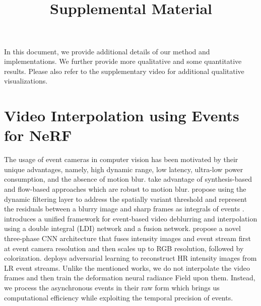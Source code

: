 \documentclass[10pt,twocolumn,letterpaper]{article}
\begin{document}
\title{\paperTitle \\ Supplemental Material}
\author{\authorBlock}
\maketitle
\renewcommand\thesection{\Alph{section}}
In this document, we provide additional details of our method and implementations. We further provide more qualitative and some quantitative results. Please also refer to the supplementary video for additional qualitative visualizations. 


\section{Video Interpolation using Events for NeRF}
The usage of event cameras in computer vision has been motivated by their unique advantages, namely, high dynamic range, low latency, ultra-low power consumption, and the absence of motion blur. \cite{tulyakov2021time} take advantage of synthesis-based and flow-based approaches which are robust to motion blur. \cite{lin2020learning} propose using the dynamic filtering layer to address the spatially variant threshold and represent the residuals between a blurry image and sharp frames as integrals of events \cite{pan2019bringing}. \cite{zhang2022unifying} introduces a unified framework for event-based video deblurring and interpolation using a double integral (LDI) network and a fusion network. \cite{paikin2021efi} propose a novel three-phase CNN architecture that fuses intensity images and event stream first at event camera resolution and then scales up to RGB resolution, followed by colorization. \cite{wang2020eventsr} deploys adversarial learning to reconstruct HR intensity images from LR event streams. Unlike the mentioned works,  we do not interpolate the video frames and then train the deformation neural radiance Field upon them. Instead, we process the asynchronous events in their raw form which brings us computational efficiency while exploiting the temporal precision of events.



\end{document}
